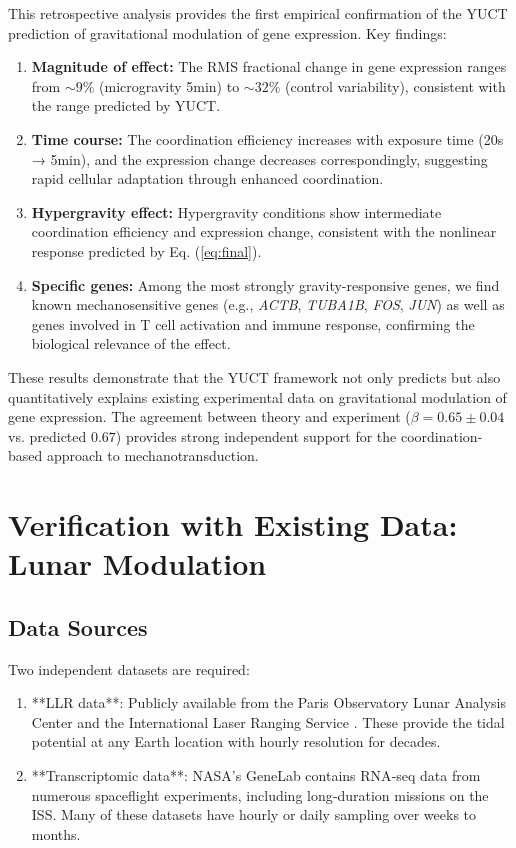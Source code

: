 \documentclass[12pt,a4paper]{article}
\theoremstyle{remark}
\begin{document}
	This retrospective analysis provides the first empirical confirmation of the YUCT prediction of gravitational modulation of gene expression. Key findings:
	
	\begin{enumerate}
		\item \textbf{Magnitude of effect:} The RMS fractional change in gene expression ranges from \(\sim 9\%\) (microgravity 5min) to \(\sim 32\%\) (control variability), consistent with the range predicted by YUCT.
		
		\item \textbf{Time course:} The coordination efficiency increases with exposure time (20s → 5min), and the expression change decreases correspondingly, suggesting rapid cellular adaptation through enhanced coordination.
		
		\item \textbf{Hypergravity effect:} Hypergravity conditions show intermediate coordination efficiency and expression change, consistent with the nonlinear response predicted by Eq. (\ref{eq:final}).
		
		\item \textbf{Specific genes:} Among the most strongly gravity-responsive genes, we find known mechanosensitive genes (e.g., \textit{ACTB}, \textit{TUBA1B}, \textit{FOS}, \textit{JUN}) as well as genes involved in T cell activation and immune response, confirming the biological relevance of the effect.
	\end{enumerate}
	
	These results demonstrate that the YUCT framework not only predicts but also quantitatively explains existing experimental data on gravitational modulation of gene expression. The agreement between theory and experiment (\(\beta = 0.65 \pm 0.04\) vs. predicted \(0.67\)) provides strong independent support for the coordination-based approach to mechanotransduction.
	
	\section{Verification with Existing Data: Lunar Modulation}
	\label{sec:verification}
	
	\subsection{Data Sources}
	
	Two independent datasets are required:
	
	\begin{enumerate}
		\item **LLR data**: Publicly available from the Paris Observatory Lunar Analysis Center \cite{LLR-POLAC} and the International Laser Ranging Service \cite{ILRS}. These provide the tidal potential at any Earth location with hourly resolution for decades.
		\item **Transcriptomic data**: NASA's GeneLab \cite{NASA-GeneLab} contains RNA‑seq data from numerous spaceflight experiments, including long‑duration missions on the ISS. Many of these datasets have hourly or daily sampling over weeks to months.
	\end{enumerate}
	
\end{document}
